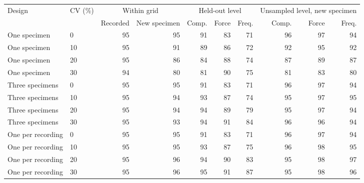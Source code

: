 \begin{tabular}{llrrrrrrrr}
\toprule
Design & CV (\%) & \multicolumn{2}{c}{Within grid} & \multicolumn{3}{c}{Held-out level} & \multicolumn{3}{c}{Unsampled level, new specimen} \\
\cmidrule(lr){3-4}\cmidrule(lr){5-7}\cmidrule(lr){8-10}
 & & Recorded & New specimen & Comp. & Force & Freq. & Comp. & Force & Freq. \\
\midrule
One specimen & 0 & 95 & 95 & 91 & 83 & 71 & 96 & 97 & 94 \\
One specimen & 10 & 95 & 91 & 89 & 86 & 72 & 92 & 95 & 92 \\
One specimen & 20 & 95 & 86 & 84 & 88 & 74 & 87 & 89 & 87 \\
One specimen & 30 & 94 & 80 & 81 & 90 & 75 & 81 & 83 & 80 \\
\midrule
Three specimens & 0 & 95 & 95 & 91 & 83 & 71 & 96 & 97 & 94 \\
Three specimens & 10 & 95 & 94 & 93 & 87 & 74 & 95 & 97 & 95 \\
Three specimens & 20 & 95 & 94 & 94 & 89 & 79 & 95 & 97 & 94 \\
Three specimens & 30 & 95 & 93 & 94 & 91 & 84 & 96 & 96 & 94 \\
\midrule
One per recording & 0 & 95 & 95 & 91 & 83 & 71 & 96 & 97 & 94 \\
One per recording & 10 & 95 & 95 & 93 & 87 & 75 & 96 & 98 & 95 \\
One per recording & 20 & 95 & 96 & 94 & 90 & 83 & 95 & 98 & 97 \\
One per recording & 30 & 95 & 96 & 95 & 91 & 87 & 95 & 98 & 96 \\
\bottomrule
\end{tabular}
